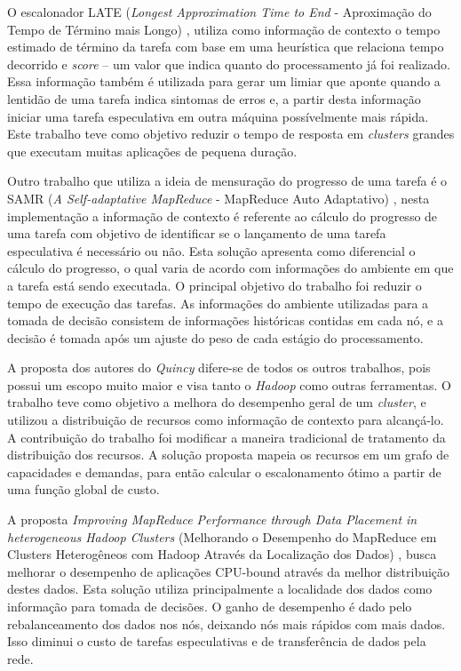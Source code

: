 O escalonador LATE (\textit{Longest Approximation Time to End} - Aproximação do Tempo de Término mais Longo) \citet{LATE}, utiliza como informação de contexto o tempo estimado de término da tarefa com base em uma heurística que relaciona tempo decorrido e \textit{score} -- um valor que indica quanto do processamento já foi realizado. Essa informação também é utilizada para gerar um limiar que aponte quando a lentidão de uma tarefa indica sintomas de erros e, a partir desta informação iniciar uma tarefa especulativa em outra máquina possívelmente mais rápida. Este trabalho teve como objetivo reduzir o tempo de resposta em \textit{clusters} grandes que executam muitas aplicações de pequena duração.

Outro trabalho que utiliza a ideia de mensuração do progresso de uma tarefa é o SAMR (\textit{A Self-adaptative MapReduce} - MapReduce Auto Adaptativo) \citet{SAMR}, nesta implementação a informação de contexto é referente ao cálculo do progresso de uma tarefa com objetivo de identificar se o lançamento de uma tarefa especulativa é necessário ou não. Esta solução apresenta como diferencial o cálculo do progresso, o qual varia de acordo com informações do ambiente em que a tarefa está sendo executada. O principal objetivo do trabalho foi reduzir o tempo de execução das tarefas. As informações do ambiente utilizadas para a tomada de decisão consistem de informações históricas contidas em cada nó, e a decisão é tomada após um ajuste do peso de cada estágio do processamento.


A proposta dos autores do \textit{Quincy} \citet{Quincy} difere-se de todos os outros trabalhos, pois possui um escopo muito maior e visa tanto o \textit{Hadoop} como outras ferramentas. O trabalho teve como objetivo a melhora do desempenho geral de um \textit{cluster}, e utilizou a distribuição de recursos como informação de contexto para alcançá-lo. A contribuição do trabalho foi modificar a maneira tradicional de tratamento da distribuição dos recursos. A solução proposta mapeia os recursos em um grafo de capacidades e demandas, para então calcular o escalonamento ótimo a partir de uma função global de custo.

A proposta \textit{Improving MapReduce Performance through Data Placement in heterogeneous Hadoop Clusters} (Melhorando o Desempenho do MapReduce em Clusters Heterogêneos com Hadoop Através da Localização dos Dados) \citet{IMRPDPHHC}, busca melhorar o desempenho de aplicações CPU-bound através da melhor distribuição destes dados. Esta solução utiliza principalmente a localidade dos dados como informação para tomada de decisões. O ganho de desempenho é dado pelo rebalanceamento dos dados nos nós, deixando nós mais rápidos com mais dados. Isso diminui o custo de tarefas especulativas e de transferência de dados pela rede.

